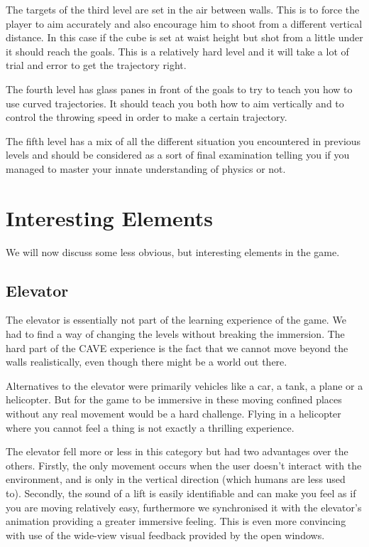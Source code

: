 \documentclass[a4paper]{article}
\begin{document}
The targets of the third level are set in the air between walls. This is to
force the player to aim accurately and also encourage him to shoot from a
different vertical distance. In this case if the cube is set at waist height but
shot from a little under it should reach the goals. This is a relatively hard
level and it will take a lot of trial and error to get the trajectory right.

The fourth level has glass panes in front of the goals to try to teach you how
to use curved trajectories. It should teach you both how to aim vertically and
to control the throwing speed in order to make a certain trajectory.

The fifth level has a mix of all the different situation you encountered in
previous levels and should be considered as a sort of final examination telling
you if you managed to master your innate understanding of physics or not.


\section{Interesting Elements}
\label{sec:elements}
We will now discuss some less obvious, but interesting elements in the game.

\subsection{Elevator}

The elevator is essentially not part of the learning experience of the game.
We had to find a way of changing the levels without breaking the immersion.
The hard part of the CAVE experience is the fact that we cannot move beyond
the walls realistically, even though there might be a world out there.

Alternatives to the elevator were primarily vehicles like a car, a tank, a
plane or a helicopter. But for the game to be immersive in these moving confined places
without any real movement would be a hard challenge. Flying in a helicopter
where you cannot feel a thing is not exactly a thrilling experience.

The elevator fell more or less in this category but had two advantages over the
others. Firstly, the only movement occurs when the user doesn't interact with the
environment, and is only in the vertical direction (which humans are less used to).
Secondly, the sound of a lift is easily identifiable and can make you feel as if
you are moving relatively easy, furthermore we synchronised it with the elevator's
animation providing a greater immersive feeling. This is even more convincing with use of the 
wide-view visual feedback provided by the open windows. 
\end{document}
